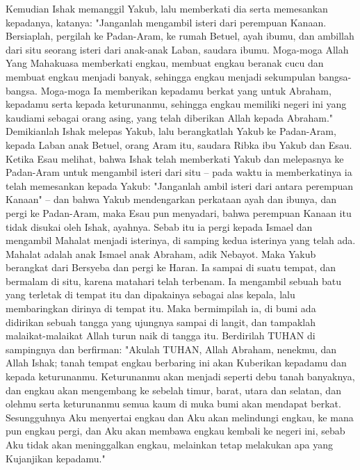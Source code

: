 \begin{biblechapter} %
\verse Kemudian Ishak memanggil Yakub, lalu memberkati dia serta memesankan kepadanya, katanya: "Janganlah mengambil isteri dari perempuan Kanaan.
\verse Bersiaplah, pergilah ke Padan-Aram, ke rumah Betuel, ayah ibumu, dan ambillah dari situ seorang isteri dari anak-anak Laban, saudara ibumu.
\verse Moga-moga Allah Yang Mahakuasa memberkati engkau, membuat engkau beranak cucu dan membuat engkau menjadi banyak, sehingga engkau menjadi sekumpulan bangsa-bangsa.
\verse Moga-moga Ia memberikan kepadamu berkat yang untuk Abraham, kepadamu serta kepada keturunanmu, sehingga engkau memiliki negeri ini yang kaudiami sebagai orang asing, yang telah diberikan Allah kepada Abraham."
\verse Demikianlah Ishak melepas Yakub, lalu berangkatlah Yakub ke Padan-Aram, kepada Laban anak Betuel, orang Aram itu, saudara Ribka ibu Yakub dan Esau.
\verse Ketika Esau melihat, bahwa Ishak telah memberkati Yakub dan melepasnya ke Padan-Aram untuk mengambil isteri dari situ -- pada waktu ia memberkatinya ia telah memesankan kepada Yakub: "Janganlah ambil isteri dari antara perempuan Kanaan" --
\verse dan bahwa Yakub mendengarkan perkataan ayah dan ibunya, dan pergi ke Padan-Aram,
\verse maka Esau pun menyadari, bahwa perempuan Kanaan itu tidak disukai oleh Ishak, ayahnya.
\verse Sebab itu ia pergi kepada Ismael dan mengambil Mahalat menjadi isterinya, di samping kedua isterinya yang telah ada. Mahalat adalah anak Ismael anak Abraham, adik Nebayot.
 Maka Yakub berangkat dari Bersyeba dan pergi ke Haran.
\verse Ia sampai di suatu tempat, dan bermalam di situ, karena matahari telah terbenam. Ia mengambil sebuah batu yang terletak di tempat itu dan dipakainya sebagai alas kepala, lalu membaringkan dirinya di tempat itu.
\verse Maka bermimpilah ia, di bumi ada didirikan sebuah tangga yang ujungnya sampai di langit, dan tampaklah malaikat-malaikat Allah turun naik di tangga itu.
\verse Berdirilah TUHAN di sampingnya dan berfirman: "Akulah TUHAN, Allah Abraham, nenekmu, dan Allah Ishak; tanah tempat engkau berbaring ini akan Kuberikan kepadamu dan kepada keturunanmu.
\verse Keturunanmu akan menjadi seperti debu tanah banyaknya, dan engkau akan mengembang ke sebelah timur, barat, utara dan selatan, dan olehmu serta keturunanmu semua kaum di muka bumi akan mendapat berkat.
\verse Sesungguhnya Aku menyertai engkau dan Aku akan melindungi engkau, ke mana pun engkau pergi, dan Aku akan membawa engkau kembali ke negeri ini, sebab Aku tidak akan meninggalkan engkau, melainkan tetap melakukan apa yang Kujanjikan kepadamu."

\end{biblechapter}

